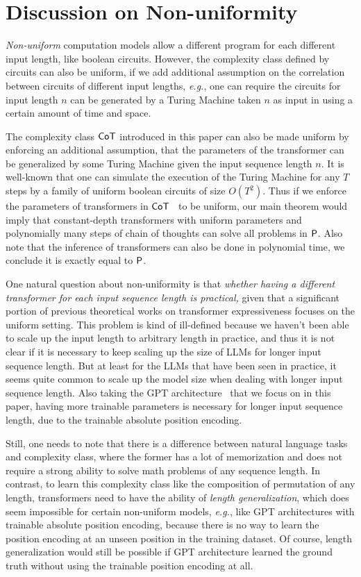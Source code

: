\section{Discussion on Non-uniformity}\label{appsec:non_uniformity}


\emph{Non-uniform} computation models allow a different program for each different input length, like boolean circuits. However, the complexity class defined by circuits can also be uniform, if we add additional assumption on the correlation between circuits of different input lengths, \emph{e.g.}, one can require the circuits for input length $n$ can be generated by a Turing Machine taken $n$ as input in using a certain amount of time and space. 

The complexity class $\Cot$ introduced in this paper can also be made uniform by enforcing an additional assumption, that the parameters of the transformer can be generalized by some Turing Machine given the input sequence length $n$. It is well-known that one can simulate the execution of the Turing Machine for any $T$ steps by a family of uniform boolean circuits of size $O(T^2)$. Thus if we enforce the parameters of transformers in $\Cot$~ to be uniform, our main theorem would imply that constant-depth transformers with uniform parameters and polynomially many steps of chain of thoughts can solve all problems in $\P$. Also note that the inference of transformers can also be done in polynomial time, we conclude it is exactly equal to $\P$.


One natural question about non-uniformity is that \emph{whether having a different transformer for each input sequence length is practical,} given that a significant portion of previous theoretical works on transformer expressiveness focuses on the uniform setting. This problem is kind of ill-defined because we haven't been able to scale up the input length to arbitrary length in practice, and thus it is not clear if it is necessary to keep scaling up the size of LLMs for longer input sequence length. But at least for the LLMs that have been seen in practice, it seems quite common to scale up the model size when dealing with longer input sequence length. Also taking the GPT architecture~\citep{radford2019language} that we focus on in this paper, having more trainable parameters is necessary for longer input sequence length, due to the trainable absolute position encoding. 

Still, one needs to note that there is a difference between natural language tasks and complexity class, where the former has a lot of memorization and does not require a strong ability to solve math problems of any sequence length. In contrast, to learn this complexity class like the composition of permutation of any length, transformers need to have the ability of \emph{length generalization}, which does seem impossible for certain non-uniform models, \emph{e.g.}, like GPT architectures with trainable absolute position encoding, because there is no way to learn the position encoding at an unseen position in the training dataset. Of course, length generalization would still be possible if GPT architecture learned the ground truth without using the trainable position encoding at all.


